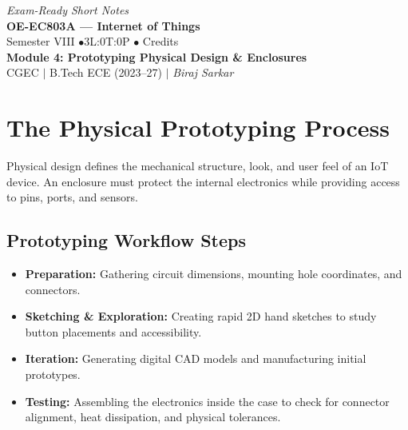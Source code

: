 \documentclass[12pt,a4paper]{article}
\begin{document}
\begin{center}
  \hfill \textit{Exam-Ready Short Notes} \\
  \vspace{6pt}
  {\LARGE\bfseries\color{myred} OE-EC803A --- Internet of Things}\\[5pt]
  {\normalsize\color{mydark} Semester VIII \quad$\bullet$\quad 3L:0T:0P \quad$\bullet$ Credits}\\[3pt]
  {\normalsize\color{myteal}\textbf{Module 4: Prototyping Physical Design \& Enclosures}}\\[3pt]
  {\small\color{mydark} CGEC \;$|$\; B.Tech ECE (2023--27) \;$|$\; \textit{Biraj Sarkar}}
\end{center}
\vspace{2pt}
\noindent{\color{myred}\rule{\linewidth}{1.5pt}}
\vspace{2pt}

\hypersetup{linkcolor=mydark}
\tableofcontents
\hypersetup{linkcolor=myteal}
\newpage

\section{The Physical Prototyping Process}

Physical design defines the mechanical structure, look, and user feel of an IoT device. An enclosure must protect the internal electronics while providing access to pins, ports, and sensors.

\subsection{Prototyping Workflow Steps}
\begin{itemize}[leftmargin=*, itemsep=3pt]
  \item \textbf{Preparation:} Gathering circuit dimensions, mounting hole coordinates, and connectors.
  \item \textbf{Sketching \& Exploration:} Creating rapid 2D hand sketches to study button placements and accessibility.
  \item \textbf{Iteration:} Generating digital CAD models and manufacturing initial prototypes.
  \item \textbf{Testing:} Assembling the electronics inside the case to check for connector alignment, heat dissipation, and physical tolerances.
\end{itemize}
\end{document}
